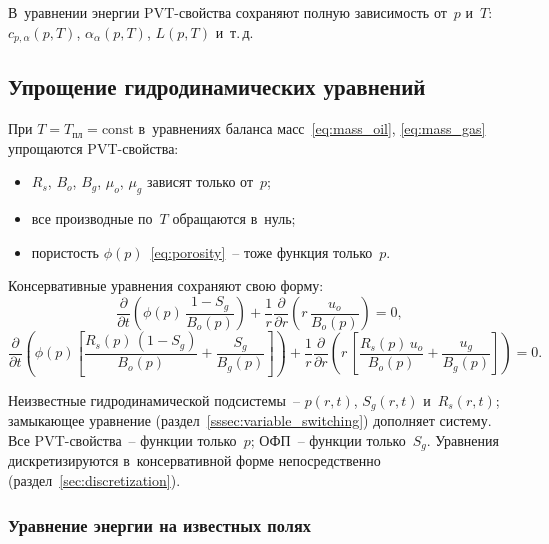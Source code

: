 \documentclass[12pt,a4paper]{article}
\newcommand{\Tpl}{T_{\text{пл}}}
\newcommand{\divr}[1]{\frac{1}{r}\frac{\partial}{\partial r}\!\left(r\,#1\right)}
\newcommand{\pdt}[1]{\frac{\partial #1}{\partial t}}
\begin{document}
В~уравнении энергии PVT-свойства сохраняют полную
зависимость от~$p$ и~$T$: $c_{p,\alpha}(p,T)$, $\alpha_\alpha(p,T)$,
$L(p,T)$ и~т.\,д.


\subsection{Упрощение гидродинамических уравнений}\label{ssec:simplification}

При $T = \Tpl = \mathrm{const}$ в~уравнениях
баланса масс~\eqref{eq:mass_oil}, \eqref{eq:mass_gas} упрощаются
PVT-свойства:
\begin{itemize}[nosep]
  \item $R_s$, $B_o$, $B_g$, $\mu_o$, $\mu_g$ зависят только от~$p$;
  \item все производные по~$T$ обращаются в~нуль;
  \item пористость $\phi(p)$~\eqref{eq:porosity}~-- тоже функция только~$p$.
\end{itemize}

Консервативные уравнения сохраняют свою форму:
\begin{equation}\label{eq:mass_oil_simplified}
  \boxed{
    \pdt{}\!\left(\phi(p)\,\frac{1 - S_g}{B_o(p)}\right)
    + \divr{\frac{u_o}{B_o(p)}} = 0,
  }
\end{equation}
\begin{equation}\label{eq:mass_gas_simplified}
  \boxed{
    \pdt{}\!\left(\phi(p)\!\left[
      \frac{R_s(p)\,(1 - S_g)}{B_o(p)} + \frac{S_g}{B_g(p)}
    \right]\right)
    + \divr{\left[
      \frac{R_s(p)\,u_o}{B_o(p)} + \frac{u_g}{B_g(p)}
    \right]} = 0.
  }
\end{equation}

Неизвестные гидродинамической подсистемы~-- $p(r,t)$, $S_g(r,t)$
и~$R_s(r,t)$; замыкающее уравнение
(раздел~\ref{sssec:variable_switching}) дополняет систему.
Все PVT-свойства~-- функции только~$p$;
ОФП~-- функции только~$S_g$. Уравнения дискретизируются
в~консервативной форме непосредственно
(раздел~\ref{sec:discretization}).

\subsubsection{Уравнение энергии на известных полях}
\end{document}
